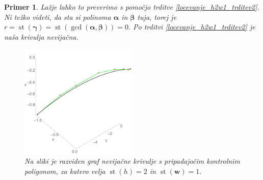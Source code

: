 \documentclass[12pt,a4paper,twoside]{article}
\theoremstyle{definition} %
\theoremstyle{plain} %
\theoremstyle{primerstyle}
\newtheorem{primer}[definicija]{Primer}
\numberwithin{equation}{section}  %
\newcommand{\wV}{\mathbf{w}}
\newcommand{\balpha}{\boldsymbol \alpha}
\newcommand{\bbeta}{\boldsymbol \beta}
\newcommand{\bgamma}{\boldsymbol \gamma}
\DeclareMathOperator{\st}{st}
\begin{document}
\begin{primer}
	Lažje lahko to preverimo s pomočjo trditve \ref{locevanje_h2w1_trditev2}. Ni težko videti, da sta si polinoma $\balpha$ in $\bbeta$ tuja, torej je $r=\st(\bgamma)=\st(\gcd(\balpha,\bbeta))=0.$ Po trditvi \ref{locevanje_h2w1_trditev2} je naša krivulja nevijačna.
	\begin{figure}[h]
	  \centering
	  \includegraphics[width=0.5\textwidth]{images/h2w1_nevijacna.pdf}
	  \caption[Primer nevijačne krivulje ($\st(h)=2,$ $\st(\wV)=1$)]{Na sliki je razviden graf nevijačne krivulje s pripadajočim kontrolnim poligonom, za katero velja $\st(h)=2$ in $\st(\wV)=1.$}
	  \label{fig:h2w1_nevijacna}
	\end{figure}
\end{primer}
\end{document}
